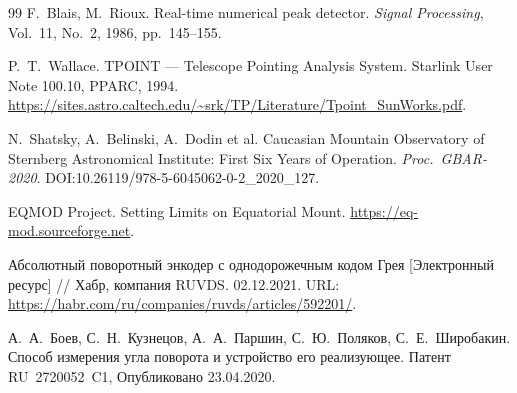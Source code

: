 \begin{thebibliography}{99}
F.~Blais, M.~Rioux.
Real-time numerical peak detector.
\textit{Signal Processing}, Vol.~11, No.~2, 1986, pp.~145--155.

P.~T.~Wallace.
TPOINT --- Telescope Pointing Analysis System.
Starlink User Note 100.10, PPARC, 1994.
\url{https://sites.astro.caltech.edu/~srk/TP/Literature/Tpoint_SunWorks.pdf}.

N.~Shatsky, A.~Belinski, A.~Dodin et al.
Caucasian Mountain Observatory of Sternberg Astronomical Institute:
First Six Years of Operation.
\textit{Proc.\ GBAR-2020}.
DOI:10.26119/978-5-6045062-0-2\_2020\_127.

EQMOD Project.
Setting Limits on Equatorial Mount.
\url{https://eq-mod.sourceforge.net}.

Абсолютный поворотный энкодер с однодорожечным кодом Грея [Электронный ресурс] // Хабр, компания RUVDS.
02.12.2021.
URL: \url{https://habr.com/ru/companies/ruvds/articles/592201/}.

А.~А.~Боев, С.~Н.~Кузнецов, А.~А.~Паршин, С.~Ю.~Поляков, С.~Е.~Широбакин.
Способ измерения угла поворота и устройство его реализующее.
Патент RU~2720052~C1, Опубликовано 23.04.2020.

\end{thebibliography}